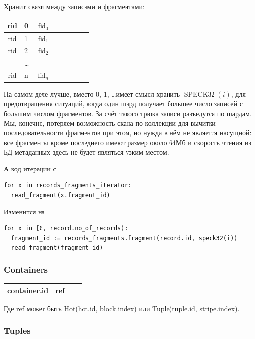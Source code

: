 \documentclass[a4paper,12pt]{article}
\begin{document}
    \bigskip
    Хранит связи между записями и фрагментами:
    \bigskip

    \begin{tabular}{|Sl|Sc|Sc|Sr|}
        \hline
        rid & 0     & $\operatorname{fid}_0$ \\
        \hline
        rid & 1     & $\operatorname{fid}_1$ \\
        \hline
        rid & 2     & $\operatorname{fid}_2$ \\
        \hline
        & \dots &                        \\
        \hline
        rid & n     & $\operatorname{fid}_n$ \\
        \hline
    \end{tabular}

    \bigskip
    На самом деле лучше, вместо 0, 1, \dots имеет смысл хранить $\operatorname{SPECK32}(i)$, для предотвращения
    ситуаций, когда один шард получает большее число записей с большим числом фрагментов. За счёт такого трюка
    записи разъедутся по шардам. Мы, конечно, потеряем возможность скана по коллекции для вычитки последовательности
    фрагментов при этом, но нужда в нём не является насущной: все фрагменты кроме последнего имеют размер около
    64Мб и скорость чтения из БД метаданных здесь не будет являться узким местом.

    А код итерации с
    \begin{lstlisting}
for x in records_fragments_iterator:
  read_fragment(x.fragment_id)
    \end{lstlisting}
    Изменится на
    \begin{lstlisting}
for x in [0, record.no_of_records):
  fragment_id := records_fragments.fragment(record.id, speck32(i))
  read_fragment(fragment_id)
    \end{lstlisting}

    \subsubsection{Containers}

    \begin{tabular}{|Sl|Sr|}
        \hline
        container.id & ref \\
        \hline
    \end{tabular}

    \bigskip
    Где ref может быть Hot(hot.id, block.index) или Tuple(tuple.id, stripe.index).

    \subsubsection{Tuples}
\end{document}
